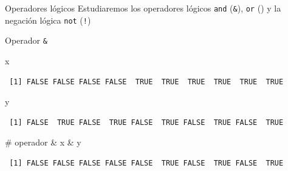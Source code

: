 \documentclass[
  ignorenonframetext,
  aspectratio=169,
  spanish,
]{beamer}
\newenvironment{Shaded}{\begin{snugshade}}{\end{snugshade}}
\newcommand{\CommentTok}[1]{\textcolor[rgb]{0.37,0.37,0.37}{#1}}
\newcommand{\NormalTok}[1]{\textcolor[rgb]{0.00,0.23,0.31}{#1}}
\newcommand{\SpecialCharTok}[1]{\textcolor[rgb]{0.37,0.37,0.37}{#1}}
\begin{document}
\begin{frame}[fragile]{Operadores lógicos}
\label{operadores-luxf3gicos}
Estudiaremos los operadores lógicos \texttt{and} (\texttt{\&}),
\texttt{or} (\texttt{\textbar{}}) y la negación lógica \texttt{not}
(\texttt{!})

\begin{block}{Operador \texttt{\&}}
\label{operador}
\begin{Shaded}
\begin{Highlighting}[]
\NormalTok{x}
\end{Highlighting}
\end{Shaded}

\begin{verbatim}
 [1] FALSE FALSE FALSE FALSE  TRUE  TRUE  TRUE  TRUE  TRUE  TRUE
\end{verbatim}

\begin{Shaded}
\begin{Highlighting}[]
\NormalTok{y}
\end{Highlighting}
\end{Shaded}

\begin{verbatim}
 [1] FALSE  TRUE FALSE  TRUE FALSE  TRUE FALSE  TRUE FALSE  TRUE
\end{verbatim}

\begin{Shaded}
\begin{Highlighting}[]
\CommentTok{\# operador \&}
\NormalTok{x }\SpecialCharTok{\&}\NormalTok{ y }
\end{Highlighting}
\end{Shaded}

\begin{verbatim}
 [1] FALSE FALSE FALSE FALSE FALSE  TRUE FALSE  TRUE FALSE  TRUE
\end{verbatim}
\end{block}
\end{frame}
\end{document}

